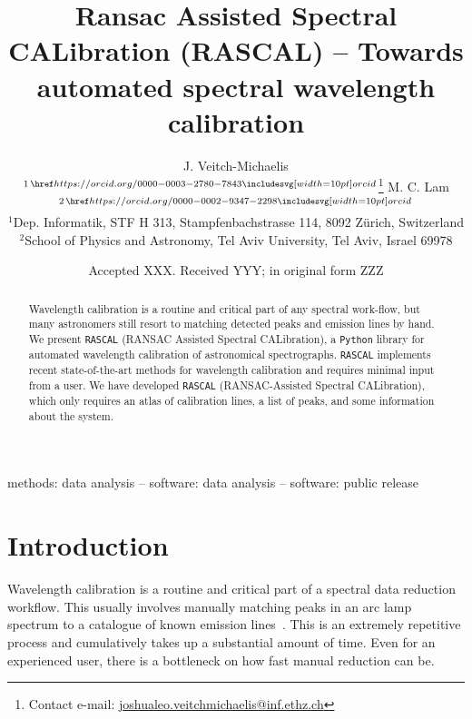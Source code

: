 \documentclass[fleqn,usenatbib]{rasti}
\title[RASCAL]{Ransac Assisted Spectral CALibration (RASCAL) -- Towards automated spectral wavelength calibration}
\author[J. Veitch-Michaelis and M. C. Lam]{
J. Veitch-Michaelis$^{1\,\orcid{0000-0003-2780-7843}}$\thanks{Contact e-mail: \href{mailto:joshualeo.veitchmichaelis@inf.ethz.ch}{joshualeo.veitchmichaelis@inf.ethz.ch}}
M. C. Lam$^{2\,\orcid{0000-0002-9347-2298}}$\\
$^{1}$Dep. Informatik, STF H 313, Stampfenbachstrasse 114, 8092 Zürich, Switzerland\\
$^{2}$School of Physics and Astronomy, Tel Aviv University, Tel Aviv, Israel 69978\\
}
\date{Accepted XXX. Received YYY; in original form ZZZ}
\begin{document}
\label{firstpage}
\pagerange{\pageref{firstpage}--\pageref{lastpage}}
\maketitle

\begin{abstract}
Wavelength calibration is a routine and critical part of any spectral work-flow, but many astronomers still resort to matching detected peaks and emission lines by hand. We present \texttt{RASCAL} (RANSAC Assisted Spectral CALibration), a \texttt{Python} library for automated wavelength calibration of astronomical spectrographs. \texttt{RASCAL} implements recent state-of-the-art methods for wavelength calibration and requires minimal input from a user. We have developed \texttt{RASCAL} (RANSAC-Assisted Spectral CALibration), which only requires an atlas of calibration lines, a list of peaks, and some information about the system.
\end{abstract}

\begin{keywords}
methods: data analysis -- software: data analysis -- software: public release
\end{keywords}

\section{Introduction}
Wavelength calibration is a routine and critical part of a spectral data reduction
workflow. This usually involves manually matching peaks in an arc lamp spectrum to a
catalogue of known emission lines~\citep{2010MNRAS.409.1601B}. This is an extremely
repetitive process and cumulatively takes up a substantial amount of time.
Even for an experienced user, there is a bottleneck on how fast manual reduction
can be.
\end{document}

